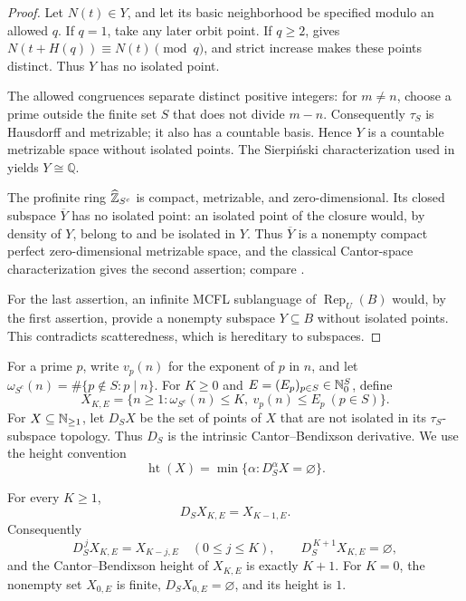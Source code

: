 \begin{proof}
  Let \(N(t)\in Y\), and let its basic neighborhood be specified modulo
  an allowed \(q\). If \(q=1\), take any later orbit point. If \(q\ge2\),
   gives
  \(N(t+H(q))\equiv N(t)\pmod q\), and strict increase makes these points
  distinct. Thus \(Y\) has no isolated point.

  The allowed congruences separate distinct positive integers: for
  \(m\ne n\), choose a prime outside the finite set \(S\) that does not
  divide \(m-n\). Consequently \(\tau_S\) is Hausdorff and metrizable;
  it also has a countable basis. Hence \(Y\) is a countable metrizable
  space without isolated points. The Sierpi\'nski characterization used
  in \cite[Theorem~2.4]{Broughan2003} yields \(Y\cong\mathbb Q\).

  The profinite ring \(\widehat{\mathbb{Z}}_{S^c}\) is compact, metrizable, and
  zero-dimensional. Its closed subspace \(\overline Y\) has no isolated
  point: an isolated point of the closure would, by density of \(Y\),
  belong to and be isolated in \(Y\). Thus \(\overline Y\) is a nonempty
  compact perfect zero-dimensional metrizable space, and the classical
  Cantor-space characterization gives the second assertion; compare
  \cite[Corollary~3.1]{Broughan2003}.

  For the last assertion, an infinite MCFL sublanguage of
  \(\operatorname{Rep}_U(B)\) would, by the first assertion, provide a
  nonempty subspace \(Y\subseteq B\) without isolated points. This
  contradicts scatteredness, which is hereditary to subspaces.
\end{proof}

For a prime \(p\), write \(v_p(n)\) for the exponent of \(p\) in \(n\),
and let \(\omega_{S^c}(n)=\#\{p\notin S:p\mid n\}\).
For \(K\ge0\) and \(E=(E_p)_{p\in S}\in\mathbb{N}_0^S\), define
\[
  X_{K,E}=\{n\ge1:\omega_{S^c}(n)\le K,
               \ v_p(n)\le E_p\ (p\in S)\}.
\]
For \(X\subseteq\mathbb{N}_{\ge1}\), let \(D_SX\) be the set of points of \(X\)
that are not isolated in its \(\tau_S\)-subspace topology. Thus \(D_S\)
is the intrinsic Cantor--Bendixson derivative. We use the height convention
\[
  \operatorname{ht}(X)=\min\{\alpha:D_S^\alpha X=\varnothing\}.
\]

\begin{proposition}
  \label{prop:local-prime-factor-cb-rank}
  For every \(K\ge1\),
  \[
    D_SX_{K,E}=X_{K-1,E}.
  \]
  Consequently
  \[
    D_S^{\,j}X_{K,E}=X_{K-j,E}\quad(0\le j\le K),
    \qquad D_S^{\,K+1}X_{K,E}=\varnothing,
  \]
  and the Cantor--Bendixson height of \(X_{K,E}\) is exactly \(K+1\).
  For \(K=0\), the nonempty set \(X_{0,E}\) is finite,
  \(D_SX_{0,E}=\varnothing\), and its height is \(1\).
\end{proposition}

